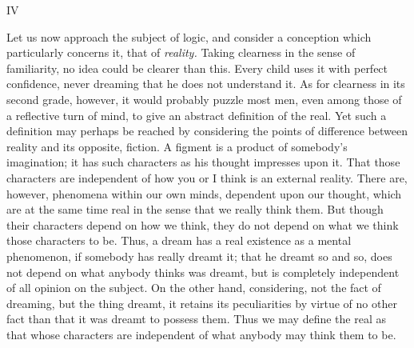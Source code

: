 \documentclass[]{article}
\newcommand{\itemsection}[1]{\bigskip\centerline{#1}\nopagebreak}
\begin{document}
\itemsection{IV}



Let us now approach the subject of logic, and consider a conception which particularly concerns it, that of \emph{reality.} Taking clearness in the sense of familiarity, no idea could be clearer than this. Every child uses it with perfect confidence, never dreaming that he does not understand it. As for clearness in its second grade, however, it would probably puzzle most men, even among those of a reflective turn of mind, to give an abstract definition of the real. Yet such a definition may perhaps be reached by considering the points of difference between reality and its opposite, fiction. A figment is a product of somebody's imagination; it has such characters as his thought impresses upon it. That those characters are independent of how you or I think is an external reality. There are, however, phenomena within our own minds, dependent upon our thought, which are at the same time real in the sense that we really think them. But though their characters depend on how we think, they do not depend on what we think those characters to be. Thus, a dream has a real existence as a mental phenomenon, if somebody has really dreamt it; that he dreamt so and so, does not depend on what anybody thinks was dreamt, but is completely independent of all opinion on the subject. On the other hand, considering, not the fact of dreaming, but the thing dreamt, it retains its peculiarities by virtue of no other fact than that it was dreamt to possess them. Thus we may define the real as that whose characters are independent of what anybody may think them to be. 
 
\end{document}
